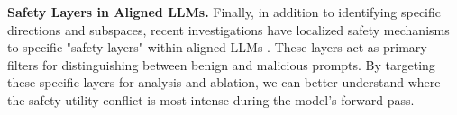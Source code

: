 \textbf{Safety Layers in Aligned LLMs.} 
Finally, in addition to identifying specific directions and subspaces, recent investigations have localized safety mechanisms to specific "safety layers" within aligned LLMs \cite{li2025safety}. These layers act as primary filters for distinguishing between benign and malicious prompts. By targeting these specific layers for analysis and ablation, we can better understand where the safety-utility conflict is most intense during the model's forward pass.
